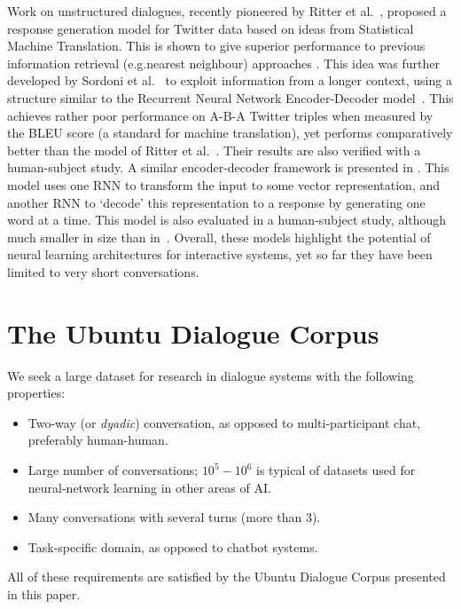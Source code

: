 \documentclass[11pt,a4paper]{article}
\begin{document}
Work on unstructured dialogues, recently pioneered by Ritter et al.~\cite{ritter2011data}, proposed a response generation model for Twitter data based on ideas from Statistical Machine Translation. This is shown to give superior performance to previous information retrieval (e.g.\@ nearest neighbour) approaches \cite{jafarpour2010filter}. This idea was further developed by Sordoni et al.~\cite{sordoni2015} to exploit information from a longer context, using a structure similar to the Recurrent Neural Network Encoder-Decoder model~\cite{cho2014learning}. This achieves rather poor performance on A-B-A Twitter triples when measured by the BLEU score (a standard for machine translation), yet performs comparatively better than the model of Ritter et al.~\cite{ritter2011data}. Their results are also verified with a human-subject study. A similar encoder-decoder framework is presented in \cite{shang2015neural}. This model uses one RNN to transform the input to some vector representation, and another RNN to `decode' this representation to a response by generating one word at a time. This model is  also evaluated in a human-subject study, although much smaller in size than in~\cite{sordoni2015}. Overall, these models highlight the potential of neural learning architectures for interactive systems, yet so far they have been limited to very short conversations.




\section{The Ubuntu Dialogue Corpus}

We seek a large dataset for research in dialogue systems with the following properties:

\begin{itemize}[noitemsep,nolistsep]
\item Two-way (or \textit{dyadic}) conversation, as opposed to multi-participant chat, preferably human-human.
\item Large number of conversations; $10^5-10^6$ is typical of datasets used for neural-network learning in other areas of AI.
\item Many conversations with several turns (more than 3).
\item Task-specific domain, as opposed to chatbot systems.
\end{itemize}
All of these requirements are satisfied by the Ubuntu Dialogue Corpus presented in this paper.
\end{document}
